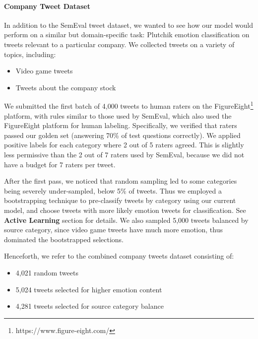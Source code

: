 \documentclass[letterpaper]{article} %
\begin{document}
\paragraph{Company Tweet Dataset}
In addition to the SemEval tweet dataset, we wanted to see how our model would perform on a similar but domain-specific task: Plutchik emotion classification on tweets relevant to a particular company. We collected tweets on a variety of topics, including:
\begin{itemize}
    \itemsep0em
    \item Video game tweets
    \item Tweets about the company stock
\end{itemize}



We submitted the first batch of 4,000 tweets to human raters on the FigureEight\footnote{https://www.figure-eight.com/} platform, with rules similar to those used by SemEval, which also used the FigureEight platform for human labeling. Specifically, we verified that raters passed our golden set (answering 70\% of test questions correctly). We applied positive labels for each category where 2 out of 5 raters agreed. This is slightly less permissive than the 2 out of 7 raters used by SemEval, because we did not have a budget for 7 raters per tweet.

After the first pass, we noticed that random sampling led to some categories being severely under-sampled, below 5\% of tweets.
Thus we employed a bootstrapping technique to pre-classify tweets by category using our current model, and choose tweets with more likely emotion tweets for classification. See \textbf{Active Learning} section for details. We also sampled 5,000 tweets balanced by source category, since video game tweets have much more emotion, thus dominated the bootstrapped selections.

Henceforth, we refer to the combined company tweets dataset consisting of:
\begin{itemize}
    \itemsep0em
    \item 4,021 random tweets
    \item 5,024 tweets selected for higher emotion content
    \item 4,281 tweets selected for source category balance
\end{itemize}
\end{document}

